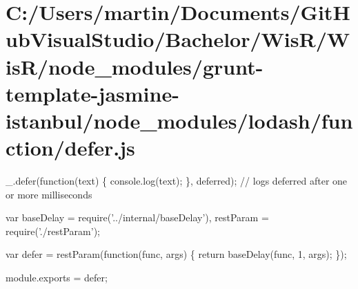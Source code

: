 \hypertarget{_c_1_2_users_2martin_2_documents_2_git_hub_visual_studio_2_bachelor_2_wis_r_2_wis_r_2node_module44f38d44da3b829db9657634f8ef7551}{}\section{C\+:/\+Users/martin/\+Documents/\+Git\+Hub\+Visual\+Studio/\+Bachelor/\+Wis\+R/\+Wis\+R/node\+\_\+modules/grunt-\/template-\/jasmine-\/istanbul/node\+\_\+modules/lodash/function/defer.\+js}
\+\_\+.\+defer(function(text) \{ console.\+log(text); \}, \textquotesingle{}deferred\textquotesingle{}); // logs \textquotesingle{}deferred\textquotesingle{} after one or more milliseconds


\begin{DoxyCodeInclude}
var baseDelay = require(\textcolor{stringliteral}{'../internal/baseDelay'}),
    restParam = require(\textcolor{stringliteral}{'./restParam'});

var defer = restParam(\textcolor{keyword}{function}(func, args) \{
  \textcolor{keywordflow}{return} baseDelay(func, 1, args);
\});

module.exports = defer;
\end{DoxyCodeInclude}
 